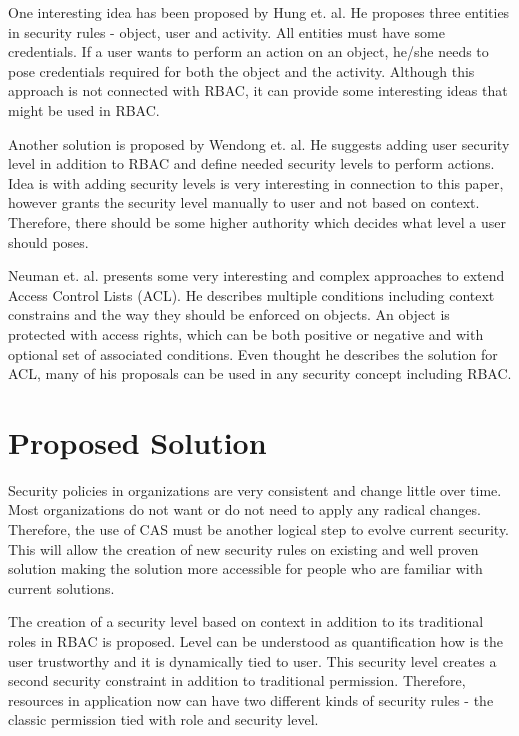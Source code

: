 \documentclass{sig-alternate}
\begin{document}
One interesting idea has been proposed by Hung et. al. \cite{hung} He proposes three entities in security rules - object, user and activity. All entities must have some credentials. If a user wants to perform an action on an object, he/she needs to pose credentials required for both the object and the activity. Although this approach is not connected with RBAC, it can provide some interesting ideas that might be used in RBAC.

Another solution is proposed by Wendong et. al. \cite{wendong} He suggests adding user security level in addition to RBAC and define needed security levels to perform actions. Idea is with adding security levels is very interesting in connection to this paper, however grants the security level manually to user and not based on context. Therefore, there should be some higher authority which decides what level a user should poses.

Neuman et. al. \cite{eacl} presents some very interesting and complex approaches to extend Access Control Lists (ACL). He describes multiple conditions including context constrains and the way they should be enforced on objects. An object is protected with access rights, which can be both positive or negative and with optional set of associated conditions. Even thought he describes the solution for ACL, many of his proposals can be used in any security concept including RBAC.

\section{Proposed Solution}
Security policies in organizations are very consistent and change little over time. Most organizations do not want or do not need to apply any radical changes. Therefore, the use of CAS must be another logical step to evolve current security. This will allow the creation of new security rules on existing and well proven solution making the solution more accessible for people who are familiar with current solutions.

The creation of a security level based on context in addition to its traditional roles in RBAC is proposed. Level can be understood as quantification how is the user trustworthy and it is dynamically tied to user. This security level creates a second security constraint in addition to traditional permission.  Therefore, resources in application now can have two different kinds of security rules - the classic permission tied with role and security level.
\end{document}
